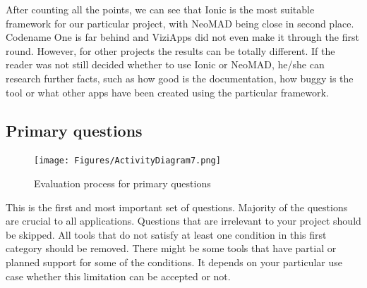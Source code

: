 \documentclass[english,master,public,dept460,male,cpdeclaration,oneside]{diploma}
\begin{document}
After counting all the points, we can see that Ionic is the most suitable framework for our particular project, with NeoMAD being close in second place. Codename One is far behind and ViziApps did not even make it through the first round. However, for other projects the results can be totally different. If the reader was not still decided whether to use Ionic or NeoMAD, he/she can research further facts, such as how good is the documentation, how buggy is the tool or what other apps have been created using the particular framework.

\subsection{Primary questions}

\begin{figure}
	\centering\texttt{[image: Figures/ActivityDiagram7.png]}
	\caption{Evaluation process for primary questions}
\end{figure}

This is the first and most important set of questions. Majority of the questions are crucial to all applications. Questions that are irrelevant to your project should be skipped. All tools that do not satisfy at least one condition in this first category should be removed. There might be some tools that have partial or planned support for some of the conditions. It depends on your particular use case whether this limitation can be accepted or not. 
\end{document}
